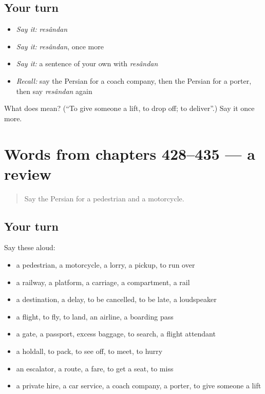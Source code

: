 \subsection*{Your turn}
\begin{itemize}
\raggedright
  \item \emph{Say it:} \emph{resândan}
  \item \emph{Say it:} \emph{resândan}, once more
  \item \emph{Say it:} a sentence of your own with \emph{resândan}
  \item \emph{Recall:} say the Persian for a coach company, then the Persian for a porter, then say \emph{resândan} again
\end{itemize}

\begin{tcolorbox}[breakable,colback=teal!4,colframe=teal!35!black,title={Before you move on}]
What does  mean? (\textquotedblleft{}To give someone a lift, to drop off; to deliver\textquotedblright{}.) Say it once more.
\end{tcolorbox}
\section[(dialogue)]{Words from chapters 428–435 — a review}

\label{lesson:FA-R435-review-428-435}



\begin{quote}
Say the Persian for a pedestrian and a motorcycle.
\end{quote}

\subsection*{Your turn}
Say these aloud:

\begin{itemize}
\raggedright
  \item a pedestrian, a motorcycle, a lorry, a pickup, to run over
  \item a railway, a platform, a carriage, a compartment, a rail
  \item a destination, a delay, to be cancelled, to be late, a loudspeaker
  \item a flight, to fly, to land, an airline, a boarding pass
  \item a gate, a passport, excess baggage, to search, a flight attendant
  \item a holdall, to pack, to see off, to meet, to hurry
  \item an escalator, a route, a fare, to get a seat, to miss
  \item a private hire, a car service, a coach company, a porter, to give someone a lift
\end{itemize}

